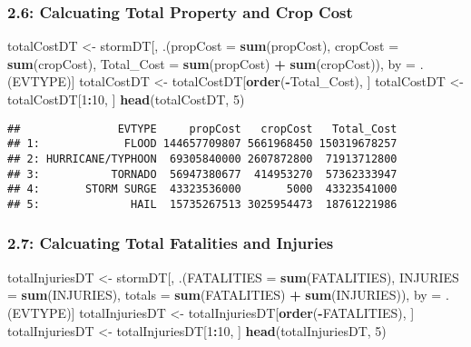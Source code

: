 \documentclass[
]{article}
\newenvironment{Shaded}{\begin{snugshade}}{\end{snugshade}}
\newcommand{\DataTypeTok}[1]{\textcolor[rgb]{0.13,0.29,0.53}{#1}}
\newcommand{\DecValTok}[1]{\textcolor[rgb]{0.00,0.00,0.81}{#1}}
\newcommand{\KeywordTok}[1]{\textcolor[rgb]{0.13,0.29,0.53}{\textbf{#1}}}
\newcommand{\NormalTok}[1]{#1}
\newcommand{\OperatorTok}[1]{\textcolor[rgb]{0.81,0.36,0.00}{\textbf{#1}}}
\newcommand{\StringTok}[1]{\textcolor[rgb]{0.31,0.60,0.02}{#1}}
\begin{document}
\hypertarget{calcuating-total-property-and-crop-cost}{%
\subsubsection{2.6: Calcuating Total Property and Crop
Cost}\label{calcuating-total-property-and-crop-cost}}

\begin{Shaded}
\begin{Highlighting}[]
\NormalTok{totalCostDT <-}\StringTok{ }\NormalTok{stormDT[, .(}\DataTypeTok{propCost =} \KeywordTok{sum}\NormalTok{(propCost), }\DataTypeTok{cropCost =} \KeywordTok{sum}\NormalTok{(cropCost), }\DataTypeTok{Total_Cost =} \KeywordTok{sum}\NormalTok{(propCost) }\OperatorTok{+}\StringTok{ }\KeywordTok{sum}\NormalTok{(cropCost)), by =}\StringTok{ }\NormalTok{.(EVTYPE)]}
\NormalTok{totalCostDT <-}\StringTok{ }\NormalTok{totalCostDT[}\KeywordTok{order}\NormalTok{(}\OperatorTok{-}\NormalTok{Total_Cost), ]}
\NormalTok{totalCostDT <-}\StringTok{ }\NormalTok{totalCostDT[}\DecValTok{1}\OperatorTok{:}\DecValTok{10}\NormalTok{, ]}
\KeywordTok{head}\NormalTok{(totalCostDT, }\DecValTok{5}\NormalTok{)}
\end{Highlighting}
\end{Shaded}

\begin{verbatim}
##               EVTYPE     propCost   cropCost   Total_Cost
## 1:             FLOOD 144657709807 5661968450 150319678257
## 2: HURRICANE/TYPHOON  69305840000 2607872800  71913712800
## 3:           TORNADO  56947380677  414953270  57362333947
## 4:       STORM SURGE  43323536000       5000  43323541000
## 5:              HAIL  15735267513 3025954473  18761221986
\end{verbatim}

\hypertarget{calcuating-total-fatalities-and-injuries}{%
\subsubsection{2.7: Calcuating Total Fatalities and
Injuries}\label{calcuating-total-fatalities-and-injuries}}

\begin{Shaded}
\begin{Highlighting}[]
\NormalTok{totalInjuriesDT <-}\StringTok{ }\NormalTok{stormDT[, .(}\DataTypeTok{FATALITIES =} \KeywordTok{sum}\NormalTok{(FATALITIES), }\DataTypeTok{INJURIES =} \KeywordTok{sum}\NormalTok{(INJURIES), }\DataTypeTok{totals =} \KeywordTok{sum}\NormalTok{(FATALITIES) }\OperatorTok{+}\StringTok{ }\KeywordTok{sum}\NormalTok{(INJURIES)), by =}\StringTok{ }\NormalTok{.(EVTYPE)]}
\NormalTok{totalInjuriesDT <-}\StringTok{ }\NormalTok{totalInjuriesDT[}\KeywordTok{order}\NormalTok{(}\OperatorTok{-}\NormalTok{FATALITIES), ]}
\NormalTok{totalInjuriesDT <-}\StringTok{ }\NormalTok{totalInjuriesDT[}\DecValTok{1}\OperatorTok{:}\DecValTok{10}\NormalTok{, ]}
\KeywordTok{head}\NormalTok{(totalInjuriesDT, }\DecValTok{5}\NormalTok{)}
\end{Highlighting}
\end{Shaded}
\end{document}
